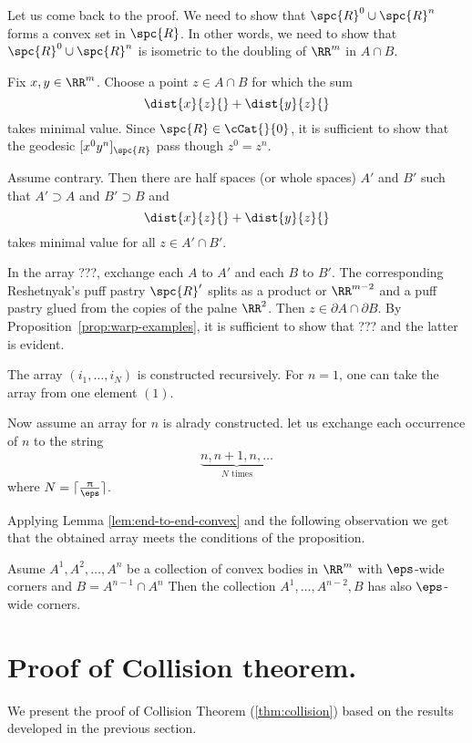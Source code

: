 Let us come back to the proof.
We need to show that $\spc{R}^0\cup\spc{R}^n$ forms a convex set in $\spc{R}$.
In other words, we need to show that $\spc{R}^0\cup\spc{R}^n$
is isometric to the doubling of $\RR^m$ in $A\cap B$. 

Fix $x,y\in \RR^m$.
Choose a point $z\in A\cap B$
for which the sum 
\[\dist{x}{z}{}+\dist{y}{z}{}\] 
takes minimal value.
Since $\spc{R}\in\cCat{}{0}$, it is sufficient to show that the geodesic $[x^0y^n]_\spc{R}$ pass though $z^0=z^n$.

Assume contrary.
Then there are half spaces (or whole spaces) $A'$ and $B'$ such that
$A'\supset A$ and $B'\supset B$
and 
\[\dist{x}{z}{}+\dist{y}{z}{}\] 
takes minimal value
for all $z\in A'\cap B'$.

In the array ???, 
exchange each $A$ to $A'$ and each $B$ to $B'$.
The corresponding Reshetnyak's puff pastry $\spc{R}'$
splits as a product or $\RR^{m-2}$ and a puff pastry
glued from the copies of the palne $\RR^2$.
Then $z\in\partial A\cap\partial B$.
By Proposition~\ref{prop:warp-examples},
it is sufficient to show that ???
and the latter is evident.
\qeds

The array $(i_1,\dots,i_N)$ is constructed recursively.
For $n=1$, one can take the array from one element $(1)$.

Now assume an array for $n$ is alrady constructed.
let us exchange each occurrence of $n$
to the string 
\[\underbrace{n,n+1,n,\dots}_{\text{$N$ times}}\]
where $N=\lceil\tfrac\pi\eps\rceil$.

Applying Lemma \ref{lem:end-to-end-convex}
and the following observation we get that the obtained array meets the conditions of the proposition.

\begin{clm}{}
Asume $A^1,A^2,\dots,A^n$ be a collection of convex bodies in $\RR^m$
with $\eps$-wide corners and $B=A^{n-1}\cap A^n$
Then the collection 
$A^1,\dots,A^{n-2},B$ has also $\eps$-wide corners.
\qeds
\end{clm}



\section{Proof of Collision theorem.}

We present the proof of Collision Theorem (\ref{thm:collision})
based on the results developed in the previous section.

